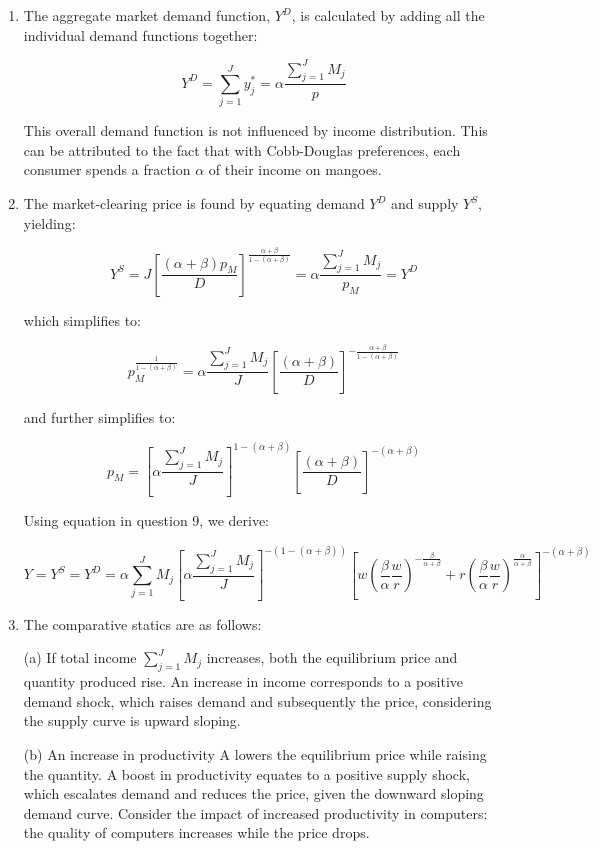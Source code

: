 \documentclass[UTF8,titlepage]{article}
\numberwithin{figure}{section}
\begin{document}
\begin{enumerate}
\item The aggregate market demand function, $Y^{D}$, is calculated by adding all the individual demand functions together:

\[Y^{D}=\sum_{j=1}^{J} y_{j}^{*}=\alpha \frac{\sum_{j=1}^{J} M_{j}}{p}\]

This overall demand function is not influenced by income distribution. This can be attributed to the fact that with Cobb-Douglas preferences, each consumer spends a fraction $\alpha$ of their income on mangoes.

\item The market-clearing price is found by equating demand $Y^{D}$ and supply $Y^{S}$, yielding:

\[Y^{S}=J\left[\frac{(\alpha+\beta) p_{M}}{D}\right]^{\frac{\alpha+\beta}{1-(\alpha+\beta)}}=\alpha \frac{\sum_{j=1}^{J} M_{j}}{p_{M}}=Y^{D}\]

which simplifies to:

\[p_{M}^{\frac{1}{1-(\alpha+\beta)}}=\alpha \frac{\sum_{j=1}^{J} M_{j}}{J}\left[\frac{(\alpha+\beta)}{D}\right]^{-\frac{\alpha+\beta}{1-(\alpha+\beta)}}\]

and further simplifies to:

\[p_{M} =\left[\alpha \frac{\sum_{j=1}^{J} M_{j}}{J}\right]^{1-(\alpha+\beta)}\left[\frac{(\alpha+\beta)}{D}\right]^{-(\alpha+\beta)}\]

Using equation in question 9, we derive:

\[Y =Y^{S}=Y^{D}=\alpha \sum_{j=1}^{J} M_{j}\left[\alpha \frac{\sum_{j=1}^{J} M_{j}}{J}\right]^{-(1-(\alpha+\beta))}\left[w\left(\frac{\beta}{\alpha} \frac{w}{r}\right)^{-\frac{\beta}{\alpha+\beta}}+r\left(\frac{\beta}{\alpha} \frac{w}{r}\right)^{\frac{\alpha}{\alpha+\beta}}\right]^{-(\alpha+\beta)}\]

\item The comparative statics are as follows:

(a) If total income $\sum_{j=1}^{J} M_{j}$ increases, both the equilibrium price and quantity produced rise. An increase in income corresponds to a positive demand shock, which raises demand and subsequently the price, considering the supply curve is upward sloping.

(b) An increase in productivity A lowers the equilibrium price while raising the quantity. A boost in productivity equates to a positive supply shock, which escalates demand and reduces the price, given the downward sloping demand curve. Consider the impact of increased productivity in computers: the quality of computers increases while the price drops.

\end{enumerate}
\end{document}
